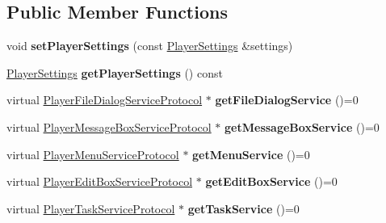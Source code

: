 \subsection*{Public Member Functions}
\begin{DoxyCompactItemize}
\item 
\mbox{\label{classPlayerProtocol_a08d9e448dab12858181b9fe81ee1d085}} 
void {\bfseries set\+Player\+Settings} (const \hyperlink{classPlayerSettings}{Player\+Settings} \&settings)
\item 
\mbox{\label{classPlayerProtocol_a33a9c0f7ce946b15ab35bf13aeb68474}} 
\hyperlink{classPlayerSettings}{Player\+Settings} {\bfseries get\+Player\+Settings} () const
\item 
\mbox{\label{classPlayerProtocol_a7fb93f90d1e777b75dbba6fc3b07e570}} 
virtual \hyperlink{classPlayerFileDialogServiceProtocol}{Player\+File\+Dialog\+Service\+Protocol} $\ast$ {\bfseries get\+File\+Dialog\+Service} ()=0
\item 
\mbox{\label{classPlayerProtocol_af8399c97054bafafb940f29ee9d4be07}} 
virtual \hyperlink{classPlayerMessageBoxServiceProtocol}{Player\+Message\+Box\+Service\+Protocol} $\ast$ {\bfseries get\+Message\+Box\+Service} ()=0
\item 
\mbox{\label{classPlayerProtocol_ad5bfa6f2de72649d8a3b7d66d894293b}} 
virtual \hyperlink{classPlayerMenuServiceProtocol}{Player\+Menu\+Service\+Protocol} $\ast$ {\bfseries get\+Menu\+Service} ()=0
\item 
\mbox{\label{classPlayerProtocol_a933a1df6410b68d153aea4a45567006b}} 
virtual \hyperlink{classPlayerEditBoxServiceProtocol}{Player\+Edit\+Box\+Service\+Protocol} $\ast$ {\bfseries get\+Edit\+Box\+Service} ()=0
\item 
\mbox{\label{classPlayerProtocol_aa3889039ec327dfa277e463cef26d2a4}} 
virtual \hyperlink{classPlayerTaskServiceProtocol}{Player\+Task\+Service\+Protocol} $\ast$ {\bfseries get\+Task\+Service} ()=0
\item 
\mbox{\label{classPlayerProtocol_a08d9e448dab12858181b9fe81ee1d085}} 

\end{DoxyCompactItemize}

